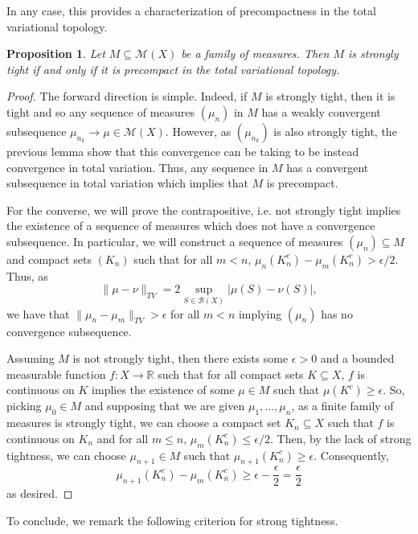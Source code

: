 \documentclass{article}
\newtheorem{proposition}{Proposition}
\begin{document}
In any case, this provides a characterization of precompactness in the total variational topology.

\begin{proposition}
Let \(M \subseteq \mathcal{M}(X)\) be a family of measures. Then \(M\) is strongly tight if and only if it is
precompact in the total variational topology.
\end{proposition}

\begin{proof}
The forward direction is simple. Indeed, if \(M\) is strongly tight, then it is tight and so any sequence
of measures \((\mu_n)\) in \(M\) has a weakly convergent subsequence \(\mu_{n_k} \to \mu \in \mathcal{M}(X)\).
However, as \((\mu_{n_k})\) is also strongly tight, the previous lemma show that this convergence
can be taking to be instead convergence in total variation. Thus, any sequence in \(M\) has a convergent
subsequence in total variation which implies that \(M\) is precompact.

For the converse, we will prove the contrapositive, i.e. not strongly tight implies the existence of a sequence
of measures which does not have a convergence subsequence. In particular, we will construct a sequence of measures
\((\mu_n) \subseteq M\) and compact sets \((K_n)\) such that for all \(m < n\),
\(\mu_n(K_n^c) - \mu_m(K_n^c) > \epsilon / 2\). Thus, as
\[\|\mu - \nu\|_{TV} = 2\sup_{S \in \mathcal{B}(X)} |\mu(S) - \nu(S)|,\]
we have that \(\|\mu_n - \mu_m\|_{TV} > \epsilon\) for all \(m < n\) implying \((\mu_n)\) has no
convergence subsequence.

Assuming \(M\) is not strongly tight, then there exists some \(\epsilon > 0\) and a bounded measurable
function \(f : X \to \mathbb{R}\) such that for all compact sets \(K \subseteq X\), \(f\) is continuous
on \(K\) implies the existence of some \(\mu \in M\) such that \(\mu(K^c) \ge \epsilon\). So, picking
\(\mu_0 \in M\) and supposing that we are given \(\mu_1, \dots, \mu_n\), as a finite family of measures
is strongly tight, we can choose a compact set \(K_n \subseteq X\) such that \(f\) is continuous on \(K_n\)
and for all \(m \le n\), \(\mu_m(K_n^c) \le \epsilon / 2\). Then, by the lack of strong tightness,
we can choose \(\mu_{n + 1} \in M\) such that \(\mu_{n + 1}(K_n^c) \ge \epsilon\). Consequently,
\[\mu_{n + 1}(K_n^c) - \mu_m(K_n^c) \ge \epsilon - \frac{\epsilon}{2} = \frac{\epsilon}{2}\]
as desired.
\end{proof}

To conclude, we remark the following criterion for strong tightness.
\end{document}

